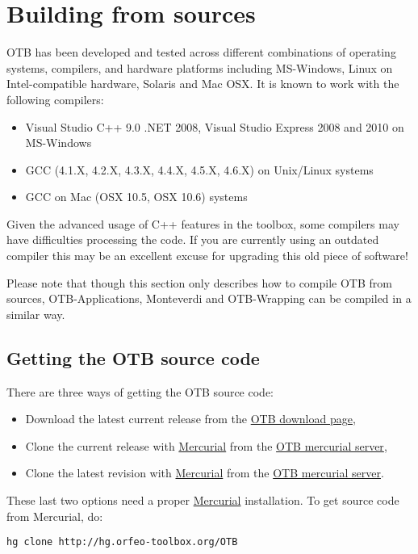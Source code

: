 \section{Building from sources}
\label{sec:source}
OTB has been developed and tested across different combinations of
operating systems, compilers, and hardware platforms including
MS-Windows, Linux on Intel-compatible hardware, Solaris and Mac
OSX.  It is known to work with the following compilers:
\begin{itemize}
\item Visual Studio C++ 9.0 .NET 2008, Visual Studio Express 2008 and 2010 on MS-Windows
\item GCC (4.1.X, 4.2.X, 4.3.X, 4.4.X, 4.5.X, 4.6.X) on Unix/Linux systems
\item GCC on Mac (OSX 10.5, OSX 10.6) systems
\end{itemize}

Given the advanced usage of C++ features in the toolbox, some
compilers may have difficulties processing the code. If you are
currently using an outdated compiler this may be an excellent excuse
for upgrading this old piece of software!

Please note that though this section only describes how to compile OTB from sources,
OTB-Applications, Monteverdi and OTB-Wrapping can be compiled in a similar way.

\subsection{Getting the OTB source code}

There are three ways of getting the OTB source code:
\begin{itemize}
\item Download the latest current release from the \href{http://sourceforge.net/projects/orfeo-toolbox/}{OTB download page},
\item Clone the current release with \href{http://mercurial.selenic.com}{Mercurial} from the \href{http://hg.orfeo-toolbox.org/OTB}{OTB mercurial server},
\item Clone the latest revision with \href{http://mercurial.selenic.com}{Mercurial} from the \href{http://hg.orfeo-toolbox.org/OTB}{OTB mercurial server}.
\end{itemize}

These last two options need a proper \href{http://mercurial.selenic.com}{Mercurial} installation. To get source code from Mercurial, do:
\begin{verbatim}
hg clone http://hg.orfeo-toolbox.org/OTB
\end{verbatim}

